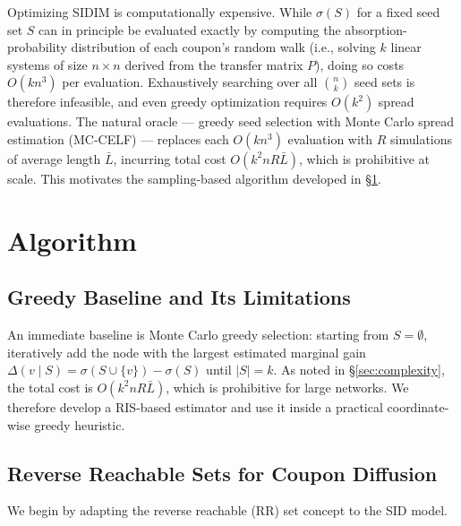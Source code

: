 \documentclass[sigconf]{acmart}
\begin{document}
Optimizing SIDIM is computationally expensive. While $\sigma(S)$ for a fixed seed set $S$ can in principle be evaluated exactly by computing the absorption-probability distribution of each coupon's random walk (i.e., solving $k$ linear systems of size $n \times n$ derived from the transfer matrix $P$), doing so costs $O(kn^3)$ per evaluation. Exhaustively searching over all $\binom{n}{k}$ seed sets is therefore infeasible, and even greedy optimization requires $O(k^2)$ spread evaluations. The natural oracle --- greedy seed selection with Monte Carlo spread estimation (MC-CELF) --- replaces each $O(kn^3)$ evaluation with $R$ simulations of average length $\bar{L}$, incurring total cost $O(k^2 n R \bar{L})$, which is prohibitive at scale. This motivates the sampling-based algorithm developed in \S\ref{sec:algo}.


\section{Algorithm}
\label{sec:algo}

\subsection{Greedy Baseline and Its Limitations}

An immediate baseline is Monte Carlo greedy selection: starting from $S = \emptyset$, iteratively add the node with the largest estimated marginal gain $\Delta(v \mid S) = \sigma(S \cup \{v\}) - \sigma(S)$ until $|S| = k$. As noted in \S\ref{sec:complexity}, the total cost is $O(k^2 n R \bar{L})$, which is prohibitive for large networks. We therefore develop a RIS-based estimator and use it inside a practical coordinate-wise greedy heuristic.

\subsection{Reverse Reachable Sets for Coupon Diffusion}

We begin by adapting the reverse reachable (RR) set concept to the SID model.
\end{document}

